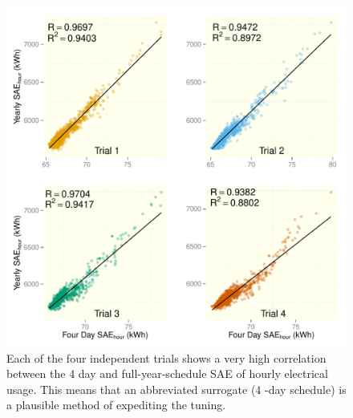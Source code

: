 \documentclass[preprint, review, 12pt]{elsarticle}
\begin{document}
\begin{figure}[htbp]
\centering
\includegraphics[width=5in]{graphics/figure1.pdf}
\caption{Each of the four independent trials shows a very high correlation between the 4 day and full-year-schedule SAE of hourly electrical usage. This means that an abbreviated surrogate (4 -day schedule) is a plausible method of expediting the tuning.}
\label{fig:hour-corr}
\end{figure}
\end{document}
